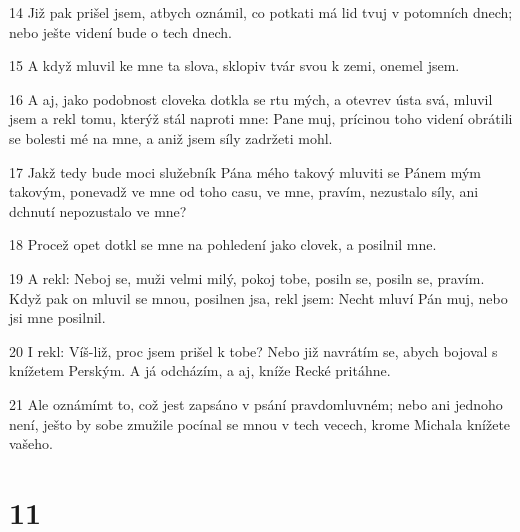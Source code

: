 \par 14 Již pak prišel jsem, atbych oznámil, co potkati má lid tvuj v potomních dnech; nebo ješte videní bude o tech dnech.
\par 15 A když mluvil ke mne ta slova, sklopiv tvár svou k zemi, onemel jsem.
\par 16 A aj, jako podobnost cloveka dotkla se rtu mých, a otevrev ústa svá, mluvil jsem a rekl tomu, kterýž stál naproti mne: Pane muj, prícinou toho videní obrátili se bolesti mé na mne, a aniž jsem síly zadržeti mohl.
\par 17 Jakž tedy bude moci služebník Pána mého takový mluviti se Pánem mým takovým, ponevadž ve mne od toho casu, ve mne, pravím, nezustalo síly, ani dchnutí nepozustalo ve mne?
\par 18 Procež opet dotkl se mne na pohledení jako clovek, a posilnil mne.
\par 19 A rekl: Neboj se, muži velmi milý, pokoj tobe, posiln se, posiln se, pravím. Když pak on mluvil se mnou, posilnen jsa, rekl jsem: Necht mluví Pán muj, nebo jsi mne posilnil.
\par 20 I rekl: Víš-liž, proc jsem prišel k tobe? Nebo již navrátím se, abych bojoval s knížetem Perským. A já odcházím, a aj, kníže Recké pritáhne.
\par 21 Ale oznámímt to, což jest zapsáno v psání pravdomluvném; nebo ani jednoho není, ješto by sobe zmužile pocínal se mnou v tech vecech, krome Michala knížete vašeho.

\chapter{11}

